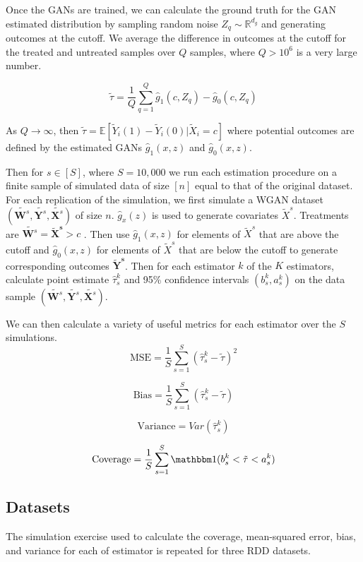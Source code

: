 \documentclass[12pt]{article}
\theoremstyle{definition}
\begin{document}
Once the GANs are trained, we can calculate the ground truth for the GAN estimated distribution by sampling random noise $Z_q \sim \mathbb R^{d_g}$ and generating outcomes at the cutoff. We average the difference in outcomes at the cutoff for the treated and untreated samples over $Q$ samples, where $Q > 10^6$ is a very large number. 

\[ \tilde \tau = \frac 1Q\sum \limits_{q=1}^Q \hat g_1(c, Z_q) - \hat g_0(c, Z_q)\]  

As $Q \rightarrow \infty$, then $\tilde \tau = \mathbb E[\tilde Y_i(1) - \tilde Y_i(0) | \tilde X_i = c]$ where potential outcomes are defined by the estimated GANs $\hat g_1(x, z)$ and $\hat g_0(x, z)$.   


Then for $s \in [S]$, where $S = 10,000$ we run each estimation procedure on a finite sample of simulated data of size $[n]$ equal to that of the original dataset. For each replication of the simulation, we first simulate a WGAN dataset $(\tilde {\bm W^s}, \tilde {\bm Y^s}, \tilde {\bm X^s})$ of size $n$.  $\hat g_x(z)$ is used to generate covariates $\tilde X^s$. Treatments are $\tilde {\bm W^s} = \bm{\tilde X^s} > c$ . Then use $\hat g_1(x, z)$ for elements of $\tilde X^s$ that are above the cutoff and $\hat g_0(x, z)$ for elements of $\tilde X^s$ that are below the cutoff to generate corresponding outcomes $\bm {\tilde Y^s}$. Then for each estimator $k$ of the $K$ estimators, calculate point estimate $\hat \tau^k_s $ and 95\% confidence intervals $( b^k_s, a^k_s)$ on the data sample $(\tilde {\bm W^s}, \tilde {\bm Y^s}, \tilde {\bm X^s})$.  

We can then calculate a variety of useful metrics for each estimator over the $S$ simulations. 
\[ \mbox{MSE} = \frac 1S \sum \limits_{s=1}^S (\hat \tau^k_s - \tilde \tau)^2 \] 

\[ \mbox{Bias} =  \frac 1S \sum \limits_{s=1}^S (\hat \tau^k_s - \tilde \tau) \] 

\[ \mbox{Variance} = Var(\hat \tau^k_s) \] 

\[ \mbox{Coverage} = \frac 1S \sum \limits_{s=1}^S \mathbbm 1 ( b^k_s < \tilde \tau < a^k_s) \] 

\subsection{Datasets}

The simulation exercise used to calculate the coverage, mean-squared error, bias, and variance for each of estimator is repeated for three RDD datasets. 
\end{document}
